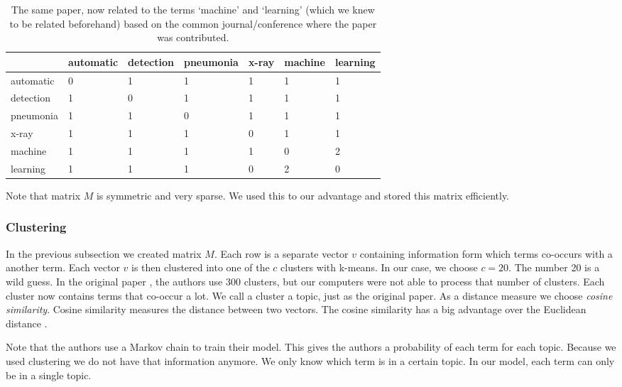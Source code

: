 \begin{table}
	\begin{center}

\begin{tabular}{|l|l|l|l|l|l|l|}
\hline
& automatic  & detection & pneumonia &  x-ray & machine & learning \\ \hline
automatic 	&	0 	& 	1 &	 1 &  1	& 1 & 1 \\ \hline
detection	&	1	&	0 &	 1 &  1	& 1 & 1 \\ \hline
pneumonia	&	1	&	1 &	 0 &  1	& 1 & 1 \\ \hline
x-ray		&	1	&	1 &	 1 &  0	& 1 & 1 \\ \hline
machine         &	1	&	1 &	 1 &  1 & 0 & 2 \\ \hline
learning	& 	1	&	1 &	 1 &  0 & 2 & 0 \\ \hline
\end{tabular} 

	\end{center}
\caption{The same paper, now related to the terms `machine' and `learning' (which we knew to be related beforehand) based on the common journal/conference where the paper was contributed.}
	\label{tab:after}
\end{table}

Note that matrix $M$ is symmetric and very sparse. We used this to our advantage and stored this matrix efficiently. %


\subsubsection*{Clustering}

In the previous subsection we created matrix $M$. Each row is a separate vector $v$ containing information form which terms co-occurs with a another term. Each vector $v$ is then clustered into one of the $c$ clusters with k-means. In our case, we choose  $c = 20$. The number 20 is a wild guess. In the original paper \cite{steyvers2004probabilistic}, the authors use 300 clusters, but our computers were not able to process that number of clusters. Each cluster now contains terms that co-occur a lot. We call a cluster a topic, just as the original paper. As a distance measure we choose \emph{cosine similarity}. Cosine similarity measures the distance between two vectors. The cosine similarity has a big advantage over the Euclidean distance \cite{chowdhury2010introduction}.  

Note that the authors use a Markov chain to train their model. This gives the authors a probability of each term for each topic. Because we used clustering we do not have that information anymore. We only know which term is in a certain topic. In our model, each term can only be in a single topic.



